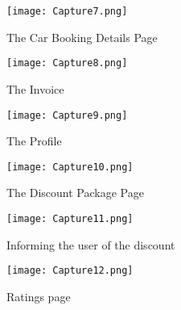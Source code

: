\documentclass[12pt]{article}
\begin{document}
\newpage
\begin{figure}[h!]
    \centering
    \texttt{[image: Capture7.png]} 
    \caption{The Car Booking Details Page}
\end{figure}

\newpage
\begin{figure}[h!]
    \centering
    \texttt{[image: Capture8.png]} 
    \caption{The Invoice}
    \texttt{[image: Capture9.png]} 
    \caption{The Profile}
\end{figure}

\newpage
\begin{figure}[h!]
    \centering
    \texttt{[image: Capture10.png]} 
    \caption{The Discount Package Page}
    \texttt{[image: Capture11.png]} 
    \caption{Informing the user of the discount}
\end{figure}

\newpage
\begin{figure}[h!]
    \centering
    \texttt{[image: Capture12.png]} 
    \caption{Ratings page}
\end{figure}
\end{document}
